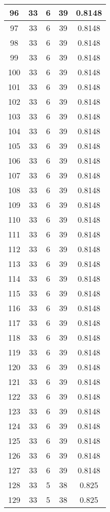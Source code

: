 \documentclass[letterpaper, 12pt]{article}
\begin{document}
\begin{longtable}{|c|c|c|c|c|}
\hline
96 & 33 & 6 & 39 & 0.8148 \\
\hline
97 & 33 & 6 & 39 & 0.8148 \\
\hline
98 & 33 & 6 & 39 & 0.8148 \\
\hline
99 & 33 & 6 & 39 & 0.8148 \\
\hline
100 & 33 & 6 & 39 & 0.8148 \\
\hline
101 & 33 & 6 & 39 & 0.8148 \\
\hline
102 & 33 & 6 & 39 & 0.8148 \\
\hline
103 & 33 & 6 & 39 & 0.8148 \\
\hline
104 & 33 & 6 & 39 & 0.8148 \\
\hline
105 & 33 & 6 & 39 & 0.8148 \\
\hline
106 & 33 & 6 & 39 & 0.8148 \\
\hline
107 & 33 & 6 & 39 & 0.8148 \\
\hline
108 & 33 & 6 & 39 & 0.8148 \\
\hline
109 & 33 & 6 & 39 & 0.8148 \\
\hline
110 & 33 & 6 & 39 & 0.8148 \\
\hline
111 & 33 & 6 & 39 & 0.8148 \\
\hline
112 & 33 & 6 & 39 & 0.8148 \\
\hline
113 & 33 & 6 & 39 & 0.8148 \\
\hline
114 & 33 & 6 & 39 & 0.8148 \\
\hline
115 & 33 & 6 & 39 & 0.8148 \\
\hline
116 & 33 & 6 & 39 & 0.8148 \\
\hline
117 & 33 & 6 & 39 & 0.8148 \\
\hline
118 & 33 & 6 & 39 & 0.8148 \\
\hline
119 & 33 & 6 & 39 & 0.8148 \\
\hline
120 & 33 & 6 & 39 & 0.8148 \\
\hline
121 & 33 & 6 & 39 & 0.8148 \\
\hline
122 & 33 & 6 & 39 & 0.8148 \\
\hline
123 & 33 & 6 & 39 & 0.8148 \\
\hline
124 & 33 & 6 & 39 & 0.8148 \\
\hline
125 & 33 & 6 & 39 & 0.8148 \\
\hline
126 & 33 & 6 & 39 & 0.8148 \\
\hline
127 & 33 & 6 & 39 & 0.8148 \\
\hline
128 & 33 & 5 & 38 & 0.825 \\
\hline
129 & 33 & 5 & 38 & 0.825 \\

\end{longtable}
\end{document}
